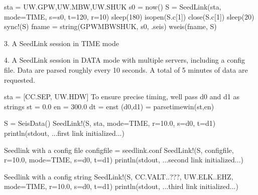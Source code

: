 \documentclass[letterpaper,11pt,english]{sphinxmanual}
\begin{document}
%
\begin{sphinxVerbatim}[commandchars=\\\{\}]
sta = \PYGZdq{}UW.GPW,UW.MBW,UW.SHUK\PYGZdq{}
s0 = now()
S = SeedLink(sta, mode=\PYGZdq{}TIME\PYGZdq{}, s=s0, t=120, r=10)
sleep(180)
isopen(S.c[1]) \PYGZam{}\PYGZam{} close(S.c[1])
sleep(20)
sync!(S)
fname = string(\PYGZdq{}GPW\PYGZus{}MBW\PYGZus{}SHUK\PYGZdq{}, s0, \PYGZdq{}.seis\PYGZdq{})
wseis(fname, S)
\end{sphinxVerbatim}

3. A SeedLink session in TIME mode

%
\begin{sphinxVerbatim}[commandchars=\\\{\}]
  
     
\end{sphinxVerbatim}

4. A SeedLink session in DATA mode with multiple servers, including a config file. Data are parsed roughly every 10 seconds. A total of 5 minutes of data are requested.

%
\begin{sphinxVerbatim}[commandchars=\\\{\}]
sta = [\PYGZdq{}CC.SEP\PYGZdq{}, \PYGZdq{}UW.HDW\PYGZdq{}]
\PYGZsh{} To ensure precise timing, we\PYGZsq{}ll pass d0 and d1 as strings
st = 0.0
en = 300.0
dt = en\PYGZhy{}st
(d0,d1) = parsetimewin(st,en)

S = SeisData()
SeedLink!(S, sta, mode=\PYGZdq{}TIME\PYGZdq{}, r=10.0, s=d0, t=d1)
println(stdout, \PYGZdq{}...first link initialized...\PYGZdq{})

\PYGZsh{} Seedlink with a config file
config\PYGZus{}file = \PYGZdq{}seedlink.conf\PYGZdq{}
SeedLink!(S, config\PYGZus{}file, r=10.0, mode=\PYGZdq{}TIME\PYGZdq{}, s=d0, t=d1)
println(stdout, \PYGZdq{}...second link initialized...\PYGZdq{})

\PYGZsh{} Seedlink with a config string
SeedLink!(S, \PYGZdq{}CC.VALT..???, UW.ELK..EHZ\PYGZdq{}, mode=\PYGZdq{}TIME\PYGZdq{}, r=10.0, s=d0, t=d1)
println(stdout, \PYGZdq{}...third link initialized...\PYGZdq{})
\end{sphinxVerbatim}



\renewcommand{\indexname}{Index}
\printindex
\end{document}
